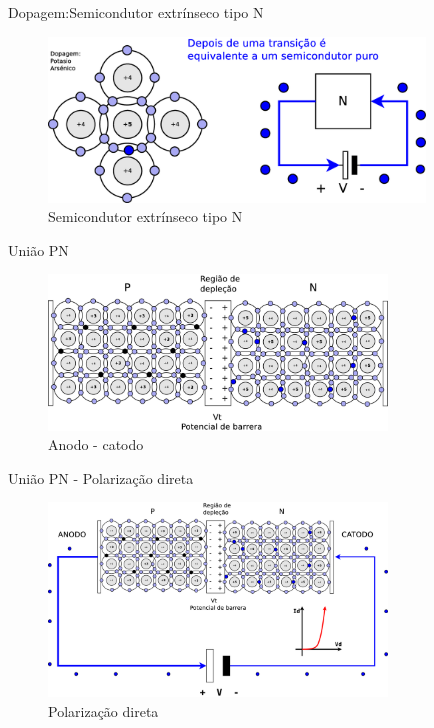 \documentclass[envcountsect,dvips]{beamer}
\begin{document}
\begin{frame}{Dopagem:Semicondutor extrínseco tipo N}
\begin{figure}
\centering
\includegraphics[width=10cm]{images/extrinsecon.eps}
\caption{Semicondutor extrínseco tipo N}
\label{fig:semin}
\end{figure}
\end{frame}

\begin{frame}{União PN  }
\begin{figure}
\centering
\includegraphics[width=9cm]{images/semipn0.eps}
\caption{Anodo - catodo}
\label{fig:semipn0}
\end{figure}
\end{frame}

\begin{frame}{União PN - Polarização direta }
\begin{figure}
\centering
\includegraphics[width=9cm]{images/semipn.eps}
\caption{Polarização direta}
\label{fig:semipn0}
\end{figure}
\end{frame}
\end{document}
